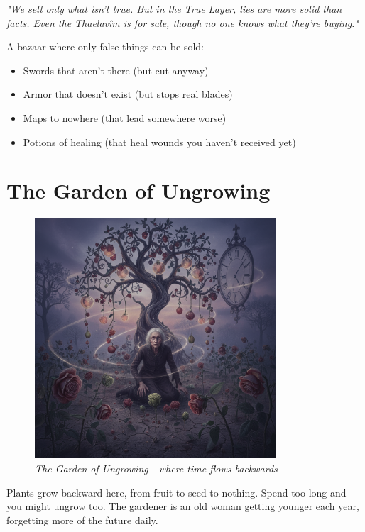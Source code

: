\documentclass[11pt,a4paper,twoside]{book}
\begin{document}
\begin{tcolorbox}[codexbox={Merchant's Warning}]
\textit{"We sell only what isn't true. But in the True Layer, lies are more solid than facts. Even the Thaelavîm is for sale, though no one knows what they're buying."}
\end{tcolorbox}

A bazaar where only false things can be sold:
\begin{itemize}
    \item Swords that aren't there (but cut anyway)
    \item Armor that doesn't exist (but stops real blades)  
    \item Maps to nowhere (that lead somewhere worse)
    \item Potions of healing (that heal wounds you haven't received yet)
\end{itemize}

\section{The Garden of Ungrowing}

\begin{figure}[h]
\centering
\includegraphics[width=0.8\textwidth]{images/garden_ungrowing_2025-09-03T22-32-01-868Z_1.png}
\caption*{\textit{The Garden of Ungrowing - where time flows backwards}}
\end{figure}

Plants grow backward here, from fruit to seed to nothing. Spend too long and you might ungrow too. The gardener is an old woman getting younger each year, forgetting more of the future daily.
\end{document}
